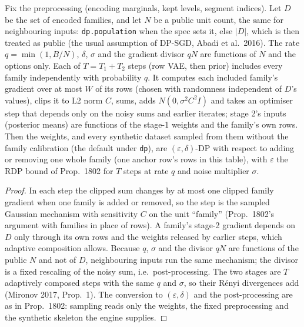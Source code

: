\setcounter{proposition}{1862}
\begin{proposition}\label{prop:ctvaedp}
Fix the preprocessing (encoding marginals, kept levels, segment indices). Let $D$ be the set of encoded families, and let $N$ be a public unit count, the same for neighbouring inputs: \texttt{dp.population} when the spec sets it, else $|D|$, which is then treated as public (the usual assumption of DP-SGD, Abadi et al.\ 2016). The rate $q=\min(1,B/N)$, $\delta$, $\sigma$ and the gradient divisor $qN$ are functions of $N$ and the options only. Each of $T=T_1+T_2$ steps (row VAE, then prior) includes every family independently with probability $q$. It computes each included family's gradient over at most $W$ of its rows (chosen with randomness independent of $D$'s values), clips it to L2 norm $C$, sums, adds $N(0,\sigma^2C^2I)$ and takes an optimiser step that depends only on the noisy sums and earlier iterates; stage 2's inputs (posterior means) are functions of the stage-1 weights and the family's own rows. Then the weights, and every synthetic dataset sampled from them without the family calibration (the default under \texttt{dp}), are $(\varepsilon,\delta)$-DP with respect to adding or removing one whole family (one anchor row's rows in this table), with $\varepsilon$ the RDP bound of Prop.~1802 for $T$ steps at rate $q$ and noise multiplier $\sigma$.
\end{proposition}
\begin{proof}
In each step the clipped sum changes by at most one clipped family gradient when one family is added or removed, so the step is the sampled Gaussian mechanism with sensitivity $C$ on the unit ``family'' (Prop.~1802's argument with families in place of rows). A family's stage-2 gradient depends on $D$ only through its own rows and the weights released by earlier steps, which adaptive composition allows. Because $q$, $\sigma$ and the divisor $qN$ are functions of the public $N$ and not of $D$, neighbouring inputs run the same mechanism; the divisor is a fixed rescaling of the noisy sum, i.e.\ post-processing. The two stages are $T$ adaptively composed steps with the same $q$ and $\sigma$, so their R\'enyi divergences add (Mironov 2017, Prop.~1). The conversion to $(\varepsilon,\delta)$ and the post-processing are as in Prop.~1802: sampling reads only the weights, the fixed preprocessing and the synthetic skeleton the engine supplies.
\end{proof}
